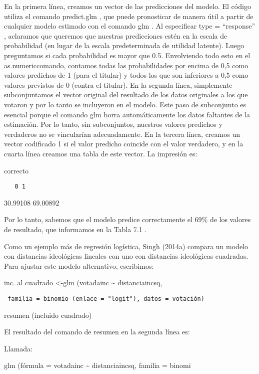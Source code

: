 \documentclass[
]{book}
\begin{document}
En la primera línea, creamos un vector de las predicciones del modelo. El código utiliza el comando predict.glm , que puede pronosticar de manera útil a partir de cualquier modelo estimado con el comando glm . Al especificar type = ``response'' , aclaramos que queremos que nuestras predicciones estén en la escala de probabilidad (en lugar de la escala predeterminada de utilidad latente). Luego preguntamos si cada probabilidad es mayor que 0.5. Envolviendo todo esto en el as.numericcomando, contamos todas las probabilidades por encima de 0,5 como valores predichos de 1 (para el titular) y todos los que son inferiores a 0,5 como valores previstos de 0 (contra el titular). En la segunda línea, simplemente subconjuntamos el vector original del resultado de los datos originales a los que votaron y por lo tanto se incluyeron en el modelo. Este paso de subconjunto es esencial porque el comando glm borra automáticamente los datos faltantes de la estimación. Por lo tanto, sin subconjuntos, nuestros valores predichos y verdaderos no se vincularían adecuadamente. En la tercera línea, creamos un vector codificado 1 si el valor predicho coincide con el valor verdadero, y en la cuarta línea creamos una tabla de este vector. La impresión es:

correcto

\begin{verbatim}
   0 1
\end{verbatim}

30.99108 69.00892

Por lo tanto, sabemos que el modelo predice correctamente el 69\% de los valores de resultado, que informamos en la Tabla 7.1 .

Como un ejemplo más de regresión logística, Singh (2014a) compara un modelo con distancias ideológicas lineales con uno con distancias ideológicas cuadradas. Para ajustar este modelo alternativo, escribimos:

inc. al cuadrado \textless-glm (votadainc \textasciitilde{} distanciaincsq,

\begin{verbatim}
 familia = binomio (enlace = "logit"), datos = votación)
\end{verbatim}

resumen (incluido cuadrado)

El resultado del comando de resumen en la segunda línea es:

Llamada:

glm (fórmula = votadainc \textasciitilde{} distanciaincsq, familia = binomi
\end{document}
